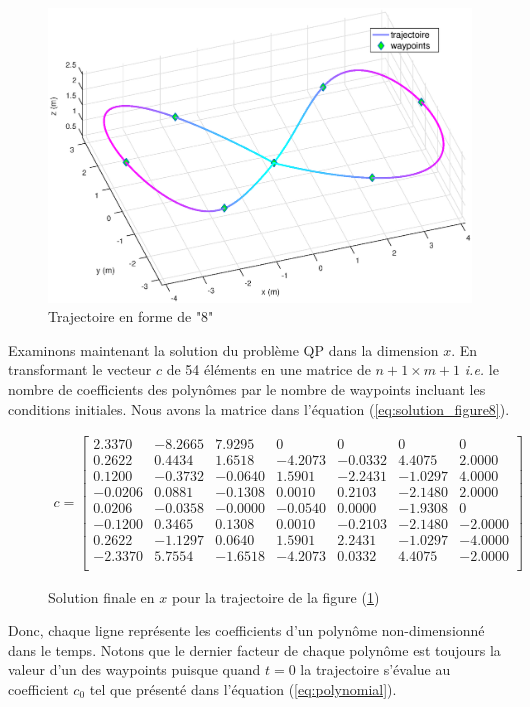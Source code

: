 \begin{figure}[h!]
	\centering
	\includegraphics[width=0.9\linewidth]{fig/figure8}
	\caption{Trajectoire en forme de "8"}
	\label{fig:figure8}
\end{figure}

Examinons maintenant la solution du problème QP dans la dimension $x$. En transformant le vecteur $c$ de 54 éléments en une matrice de $n+1 \times m+1$ \textit{i.e.} le nombre de coefficients des polynômes par le nombre de waypoints incluant les conditions initiales. Nous avons la matrice dans l'équation (\ref{eq:solution_figure8}). 

\begin{figure}
\begin{align}\label{eq:solution_figure8}
c = \begin{bmatrix}
  2.3370 &  -8.2665 &   7.9295 &        0 &        0 &        0 &        0  \\
  0.2622 &   0.4434 &   1.6518 &  -4.2073 &  -0.0332 &   4.4075 &   2.0000  \\
  0.1200 &  -0.3732 &  -0.0640 &   1.5901 &  -2.2431 &  -1.0297 &   4.0000  \\
  -0.0206 &   0.0881 &  -0.1308 &   0.0010 &   0.2103 &  -2.1480 &   2.0000 \\
  0.0206 &  -0.0358 &  -0.0000 &  -0.0540 &   0.0000 &  -1.9308 &        0  \\
  -0.1200 &   0.3465 &   0.1308 &   0.0010 &  -0.2103 &  -2.1480 &  -2.0000 \\
  0.2622 &  -1.1297 &   0.0640 &   1.5901 &   2.2431 &  -1.0297 &  -4.0000  \\
  -2.3370 &   5.7554 &  -1.6518 &  -4.2073 &   0.0332 &   4.4075 &  -2.0000 \\
\end{bmatrix}
\end{align}
	\caption{Solution finale en $x$ pour la trajectoire de la figure (\ref{fig:figure8})}
\end{figure}
Donc, chaque ligne représente les coefficients d'un polynôme non-dimensionné dans le temps. Notons que le dernier facteur de chaque polynôme est toujours la valeur d'un des waypoints puisque quand $t=0$ la trajectoire s'évalue au coefficient $c_0$ tel que présenté dans l'équation (\ref{eq:polynomial}). 

